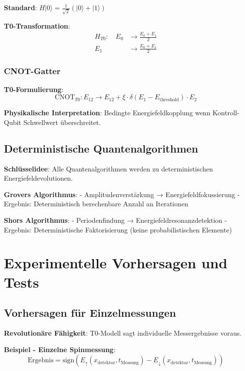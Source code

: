 \documentclass[12pt,a4paper]{article}
\newcommand{\Efield}{E}
\newcommand{\xipar}{\xi}
\begin{document}
	\textbf{Standard}: $H|0\rangle = \frac{1}{\sqrt{2}}(|0\rangle + |1\rangle)$
	
	\textbf{T0-Transformation}:
	\begin{align}
		H_{T0}: \quad \Efield_0 &\rightarrow \frac{\Efield_0 + \Efield_1}{2} \\
		\Efield_1 &\rightarrow \frac{\Efield_0 + \Efield_1}{2}
	\end{align}
	
	\subsubsection{CNOT-Gatter}
	
	\textbf{T0-Formulierung}:
	\begin{equation}
		\text{CNOT}_{T0}: \Efield_{12} \rightarrow \Efield_{12} + \xipar \cdot \delta(\Efield_1 - \Efield_{\text{threshold}}) \cdot \Efield_2
	\end{equation}
	
	\textbf{Physikalische Interpretation}: Bedingte Energiefeldkopplung wenn Kontroll-Qubit Schwellwert überschreitet.
	
	\subsection{Deterministische Quantenalgorithmen}
	
	\textbf{Schlüsselidee}: Alle Quantenalgorithmen werden zu deterministischen Energiefeldevolutionen.
	
	\textbf{Grovers Algorithmus}:
	- Amplitudenverstärkung → Energiefeldfokussierung
	- Ergebnis: Deterministisch berechenbare Anzahl an Iterationen
	
	\textbf{Shors Algorithmus}:
	- Periodenfindung → Energiefeldresonanzdetektion
	- Ergebnis: Deterministische Faktorisierung (keine probabilistischen Elemente)
	
	\section{Experimentelle Vorhersagen und Tests}
	
	\subsection{Vorhersagen für Einzelmessungen}
	
	\textbf{Revolutionäre Fähigkeit}: T0-Modell sagt individuelle Messergebnisse voraus.
	
	\textbf{Beispiel - Einzelne Spinmessung}:
	\begin{equation}
		\text{Ergebnis} = \text{sign}\left(\Efield_{\uparrow}(x_{\text{detektor}}, t_{\text{Messung}}) - \Efield_{\downarrow}(x_{\text{detektor}}, t_{\text{Messung}})\right)
	\end{equation}
	
\end{document}
